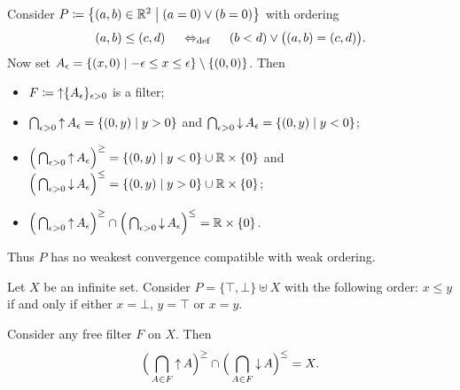 \begin{example}
Consider $P \defeq \setbuilder{(a,b)\in \R^2}{(a=0)\lor (b=0)}$ with ordering
\[ (a,b) \leq (c,d) \;\quad\Leftrightarrow_{\text{def}}\quad\; (b<d) \lor \big((a,b) = (c,d)\big). \]
Now set $A_\epsilon = \setbuilder{(x, 0)}{-\epsilon \leq x\leq \epsilon} \setminus\{(0,0)\}$. Then
\begin{itemize}
\item $F \coloneqq \operatorname{\uparrow} \{A_\epsilon\}_{\epsilon > 0}$ is a filter;
\item $\bigcap_{\epsilon > 0}\upset A_\epsilon = \setbuilder{(0,y)}{y > 0}$ and $\bigcap_{\epsilon > 0}\downset A_\epsilon = \setbuilder{(0,y)}{y < 0}$;
\item $\Big(\bigcap_{\epsilon > 0}\upset A_\epsilon\Big)^\geq = \setbuilder{(0,y)}{y < 0}\cup \R\times\{0\}$ and $\Big(\bigcap_{\epsilon > 0}\downset A_\epsilon\Big)^\leq = \setbuilder{(0,y)}{y > 0}\cup \R\times\{0\}$;
\item $\Big(\bigcap_{\epsilon > 0}\operatorname{\uparrow} A_\epsilon\Big)^\geq \cap\Big(\bigcap_{\epsilon > 0}\operatorname{\downarrow} A_\epsilon\Big)^\leq = \mathbb{R}\times\{0\}$.
\end{itemize}
Thus $P$ has no weakest convergence compatible with weak ordering.
\end{example}

 

\begin{example}
Let $X$ be an infinite set. Consider $P = \{\top, \bot\}\uplus X$ with the following order: $x\leq y$ if and only if either $x = \bot$, $y = \top$ or $x = y$.

Consider any free filter $F$ on $X$. Then
\[ \Big(\bigcap_{A\in F}\operatorname{\uparrow} A\Big)^\geq \cap \Big(\bigcap_{A\in F}\operatorname{\downarrow} A\Big)^\leq = X. \]
\end{example}

